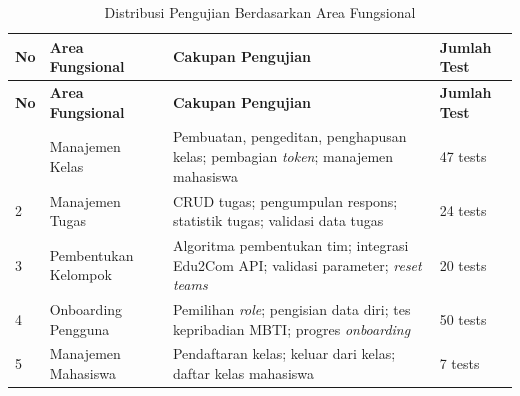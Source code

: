 \begin{longtable}{|p{}|p{}|p{}|p{}|}
	\caption{Distribusi Pengujian Berdasarkan Area Fungsional}
	\label{tab:testing-functional-coverage}                                                                                                                                                                                                               \\
	\hline
	\textbf{No}                                      & \textbf{Area Fungsional}               & \textbf{Cakupan Pengujian}                                                                                                         & \textbf{Jumlah Test} \\
	\hline
	\endfirsthead
	\hline
	\textbf{No}                                      & \textbf{Area Fungsional}               & \textbf{Cakupan Pengujian}                                                                                                         & \textbf{Jumlah Test} \\
	\hline
	\endhead
	\hline
	\endfoot
	\hline
	\endlastfoot
	1                                                & Manajemen Kelas                        & Pembuatan, pengeditan, penghapusan kelas; pembagian \textit{token}; manajemen mahasiswa                                            & 47 tests             \\
	\hline
	2                                                & Manajemen Tugas                        & CRUD tugas; pengumpulan respons; statistik tugas; validasi data tugas                                                              & 24 tests             \\
	\hline
	3                                                & Pembentukan Kelompok                   & Algoritma pembentukan tim; integrasi Edu2Com API; validasi parameter; \textit{reset teams}                                         & 20 tests             \\
	\hline
	4                                                & Onboarding Pengguna                    & Pemilihan \textit{role}; pengisian data diri; tes kepribadian MBTI; progres \textit{onboarding}                                    & 50 tests             \\
	\hline
	5                                                & Manajemen Mahasiswa                    & Pendaftaran kelas; keluar dari kelas; daftar kelas mahasiswa                                                                       & 7 tests              \\

\end{longtable}
